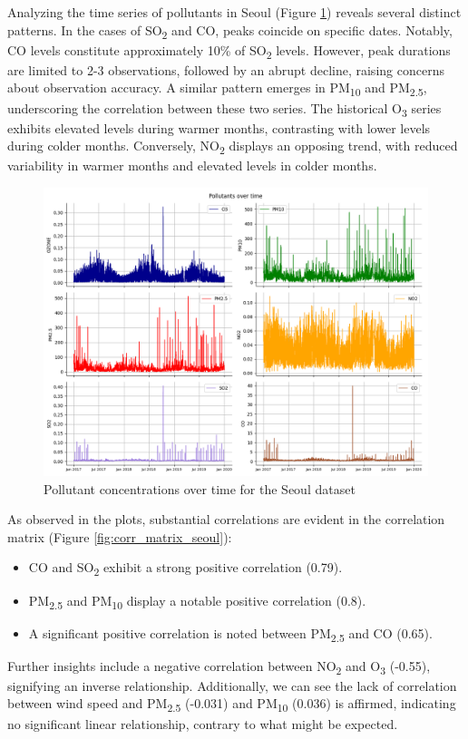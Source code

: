 Analyzing the time series of pollutants in Seoul (Figure \ref{fig:ts_seoul}) reveals several distinct patterns. In the cases of SO\textsubscript{2} and CO, peaks coincide on specific dates. Notably, CO levels constitute approximately 10\% of SO\textsubscript{2} levels. However, peak durations are limited to 2-3 observations, followed by an abrupt decline, raising concerns about observation accuracy. 
A similar pattern emerges in PM\textsubscript{10} and PM\textsubscript{2.5}, underscoring the correlation between these two series. The historical O\textsubscript{3} series exhibits elevated levels during warmer months, contrasting with lower levels during colder months.
Conversely, NO\textsubscript{2} displays an opposing trend, with reduced variability in warmer months and elevated levels in colder months. 

\begin{figure}[h]
    \centering
    \includegraphics[width=1\linewidth]{images/ts_seoul.png}
    \caption{Pollutant concentrations over time for the Seoul dataset}
    \label{fig:ts_seoul}
\end{figure}


As observed in the plots, substantial correlations are evident in the correlation matrix (Figure \ref{fig:corr_matrix_seoul}):

\begin{itemize}
    \item CO and SO\textsubscript{2} exhibit a strong positive correlation (0.79).
    \item PM\textsubscript{2.5} and PM\textsubscript{10} display a notable positive correlation (0.8).
    \item A significant positive correlation is noted between PM\textsubscript{2.5} and CO (0.65).
\end{itemize}
Further insights include a negative correlation between NO\textsubscript{2} and O\textsubscript{3} (-0.55), signifying an inverse relationship. Additionally, we can see the lack of correlation between wind speed and PM\textsubscript{2.5} (-0.031) and PM\textsubscript{10} (0.036) is affirmed, indicating no significant linear relationship, contrary to what might be expected.

